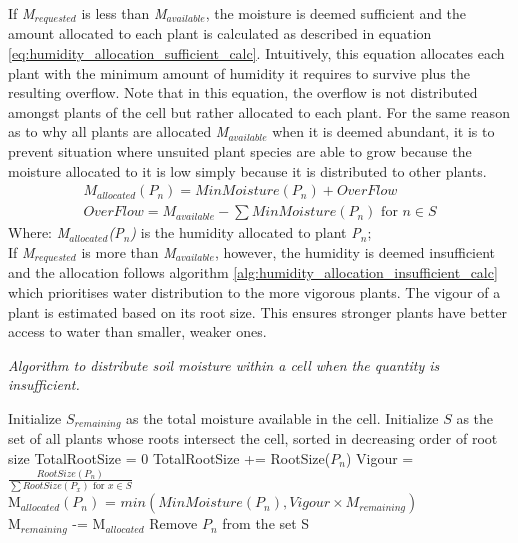 If \textit{M$_{requested}$} is less than \textit{M$_{available}$}, the moisture is deemed sufficient and the amount allocated to each plant is calculated as described in equation \ref{eq:humidity_allocation_sufficient_calc}. Intuitively, this equation allocates each plant with the minimum amount of humidity it requires to survive plus the resulting overflow. Note that in this equation, the overflow is not distributed amongst plants of the cell but rather allocated to each plant. For the same reason as to why all plants are allocated \textit{M$_{available}$} when it is deemed abundant, it is to prevent situation where unsuited plant species are able to grow because the moisture allocated to it is low simply because it is distributed to other plants.\\

\begin{equation}
\begin{split}
M_{allocated}(P_{n}) = MinMoisture(P_{n}) + OverFlow \\
OverFlow = M_{available} - \sum MinMoisture(P_{n}) \text{ for } n \in S
\end{split}
\label{eq:humidity_allocation_sufficient_calc}
\end{equation}
Where: \textit{M$_{allocated}$(P$_{n}$)} is the humidity allocated to plant \textit{P$_{n}$};\\

If \textit{M$_{requested}$} is more than \textit{M$_{available}$}, however, the humidity is deemed insufficient and the allocation follows algorithm \ref{alg:humidity_allocation_insufficient_calc} which prioritises water distribution to the more vigorous plants. The vigour of a plant is estimated based on its root size. This ensures stronger plants have better access to water than smaller, weaker ones.\\

\begin{algorithm}
\caption{\textit{Algorithm to distribute soil moisture within a cell when the quantity is insufficient.}}
\begin{algorithmic}[1]
\REQUIRE Initialize $S_{remaining}$ as the total moisture available in the cell.
\REQUIRE Initialize $S$ as the set of all plants whose roots intersect the cell, sorted in decreasing order of root size
\STATE TotalRootSize = 0
	\STATE TotalRootSize += RootSize($P_{n}$)
\ENDFOR
{}
	\STATE Vigour = $\frac{RootSize(P_{n})}{\sum RootSize(P_{x}) \text{ for } x \in S}$\\
	\STATE M$_{allocated}(P_{n})$ = $min(MinMoisture(P_{n}), Vigour \times M_{remaining})$ \\
	\STATE M$_{remaining}$ -= M$_{allocated}$
	\STATE Remove $P_{n}$ from the set S
\ENDFOR
\end{algorithmic}
\label{alg:humidity_allocation_insufficient_calc}
\end{algorithm}

